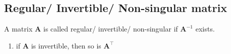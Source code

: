 \subsection{Regular/ Invertible/ Non-singular matrix}

A matrix $\bm{A}$ is called regular/ invertible/ non-singular if $\bm{A}^{-1}$ exists.
\hfill \cite{mfml/book/mml/Deisenroth-Faisal-Ong}

\begin{enumerate}
    \item if $\bm{A}$ is invertible, then so is $\bm{A}^\top$
    \hfill \cite{mfml/book/mml/Deisenroth-Faisal-Ong}
\end{enumerate}


